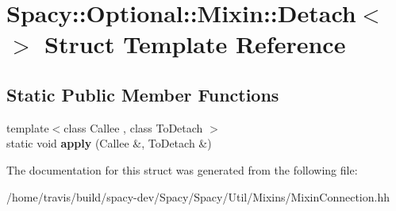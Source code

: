 \hypertarget{structSpacy_1_1Optional_1_1Mixin_1_1Detach_3_4}{\section{Spacy\-:\-:Optional\-:\-:Mixin\-:\-:Detach$<$$>$ Struct Template Reference}
\label{structSpacy_1_1Optional_1_1Mixin_1_1Detach_3_4}
}
\subsection*{Static Public Member Functions}
\begin{DoxyCompactItemize}
\item 
\hypertarget{structSpacy_1_1Optional_1_1Mixin_1_1Detach_3_4_a1ab6239f02532537e4b908bcc5cd77d1}{{\footnotesize template$<$class Callee , class To\-Detach $>$ }\\static void {\bfseries apply} (Callee \&, To\-Detach \&)}\label{structSpacy_1_1Optional_1_1Mixin_1_1Detach_3_4_a1ab6239f02532537e4b908bcc5cd77d1}

\end{DoxyCompactItemize}


The documentation for this struct was generated from the following file\-:\begin{DoxyCompactItemize}
\item 
/home/travis/build/spacy-\/dev/\-Spacy/\-Spacy/\-Util/\-Mixins/Mixin\-Connection.\-hh\end{DoxyCompactItemize}
